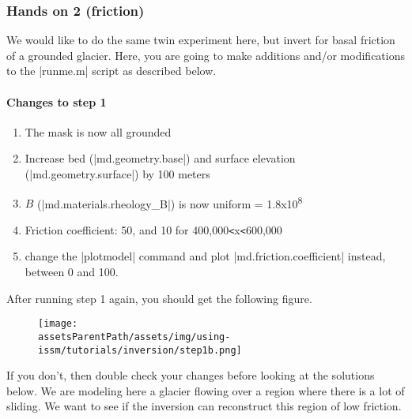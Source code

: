 \subsubsection{Hands on 2 (friction)} %
We would like to do the same twin experiment here, but invert for basal friction of a grounded glacier. Here, you are going to make additions and/or modifications to the \lstinlinebg|runme.m| script as described below.

\paragraph{Changes to step 1}
\begin{enumerate}
	\item The mask is now all grounded
	\item Increase bed (\lstinlinebg|md.geometry.base|) and surface elevation (\lstinlinebg|md.geometry.surface|) by 100 meters
	\item $B$ (\lstinlinebg|md.materials.rheology_B|) is now uniform = 1.8x10\textsuperscript{8}
	\item Friction coefficient: 50, and 10 for 400,000\verb|<|x\verb|<|600,000
	\item change the \lstinlinebg|plotmodel| command and plot \lstinlinebg|md.friction.coefficient| instead, between 0 and 100.
\end{enumerate}
After running step 1 again, you should get the following figure.
\begin{figure}[H]
	\begin{center}
		\texttt{[image: \\assetsParentPath/assets/img/using-issm/tutorials/inversion/step1b.png]}
	\end{center}
\end{figure}
If you don't, then double check your changes before looking at the solutions below. We are modeling here a glacier flowing over a region where there is a lot of sliding. We want to see if the inversion can reconstruct this region of low friction.

